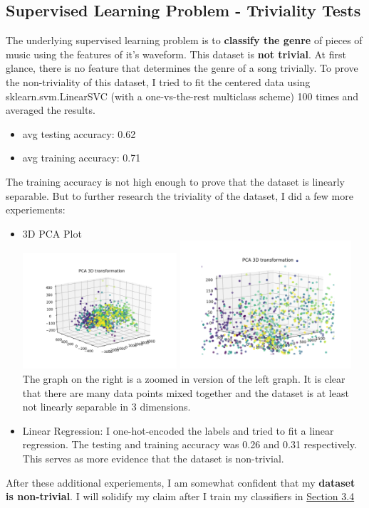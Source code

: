\documentclass[12pt]{article}
\begin{document}
\subsection{Supervised Learning Problem - Triviality Tests}
\label{trivial}
The underlying supervised learning problem is to \textbf{classify the genre} of pieces of music using the features of it's waveform. This dataset is \textbf{not trivial}. At first glance, there is no feature that determines the genre of a song trivially. To prove the non-triviality of this dataset, I tried to fit the centered data using sklearn.svm.LinearSVC (with a one-vs-the-rest multiclass scheme) 100 times and averaged the results.
\begin{itemize}
    \item avg testing accuracy: 0.62
    \item avg training accuracy: 0.71
\end{itemize}
The training accuracy is not high enough to prove that the dataset is linearly separable. But to further research the triviality of the dataset, I did a few more experiements:
\begin{itemize}
    \item 3D PCA Plot
    \\ \includegraphics[width=0.45\textwidth]{pca0} \includegraphics[width=0.5\textwidth]{pca1}
    \\ The graph on the right is a zoomed in version of the left graph. It is clear that there are many data points mixed together and the dataset is at least not linearly separable in 3 dimensions.
    \item Linear Regression: I one-hot-encoded the labels and tried to fit a linear regression. The testing and training accuracy was 0.26 and 0.31 respectively. This serves as more evidence that the dataset is non-trivial.
\end{itemize}
After these additional experiements, I am somewhat confident that my \textbf{dataset is non-trivial}. I will solidify my claim after I train my classifiers in \hyperref[notrivial]{Section 3.4}
\end{document}

